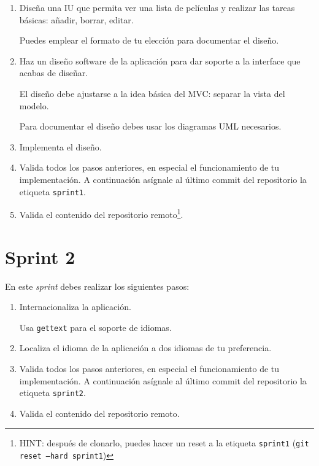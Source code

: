 \documentclass[11pt,a4paper]{article}
\begin{document}
\begin{enumerate}
\item Diseña una IU que permita ver una lista de películas y realizar
las tareas básicas: añadir, borrar, editar.

  Puedes emplear el formato de tu elección para documentar el diseño.

\item Haz un diseño software de la aplicación para dar soporte a la
  interface que acabas de diseñar.

  El diseño debe ajustarse a la idea básica del MVC: separar la vista
  del modelo.

  Para documentar el diseño debes usar los diagramas UML necesarios.

\item Implementa el diseño.

\item Valida todos los pasos anteriores, en especial el funcionamiento
  de tu implementación. A continuación asígnale al último commit del
  repositorio la etiqueta \texttt{sprint1}.

\item Valida el contenido del repositorio remoto\footnote{HINT:
    después de clonarlo, puedes hacer un reset a la etiqueta
    \texttt{sprint1} (\texttt{git reset --hard sprint1})}.
\end{enumerate}



\section{Sprint 2}

En este \emph{sprint} debes realizar los siguientes pasos:

\begin{enumerate}
\item Internacionaliza la aplicación.

  Usa \texttt{gettext} para el soporte de idiomas.

\item Localiza el idioma de la aplicación a dos idiomas de tu
  preferencia.

\item Valida todos los pasos anteriores, en especial el funcionamiento
  de tu implementación. A continuación asígnale al último commit del
  repositorio la etiqueta \texttt{sprint2}.

\item Valida el contenido del repositorio remoto.
\end{enumerate}
\end{document}
